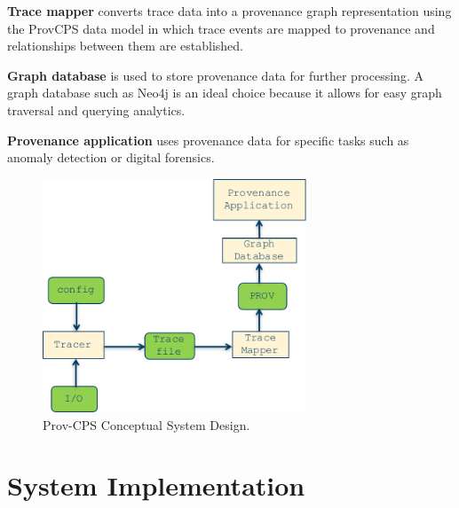  \textbf{Trace mapper} converts trace data into a provenance graph representation using the ProvCPS data model in which trace events are mapped to provenance and relationships between them are established.
 
 \textbf{Graph database} is used to store provenance data for further processing. A graph database such as Neo4j is an ideal choice because it allows for easy graph traversal and querying analytics.
 
 \textbf{Provenance application} uses provenance data for specific tasks such as anomaly detection or digital forensics. %

\begin{figure}[h!]
\begin{center}
\includegraphics[width=0.7\textwidth]{sys_arc_3_6.pdf}
\end{center}
\caption{Prov-CPS Conceptual System Design.}
\label{framework_design}
\end{figure}

\section{System Implementation} \label{system_implementation}

